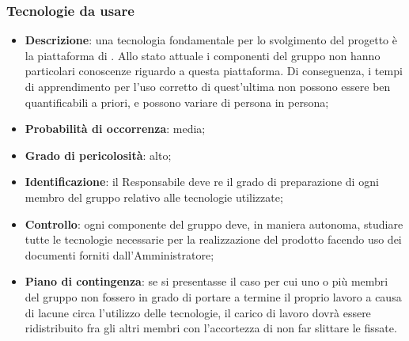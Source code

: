 \subsubsection{Tecnologie da usare}
\begin{itemize}
			\item \textbf{Descrizione}: una tecnologia fondamentale per lo svolgimento del progetto è la piattaforma  di . Allo stato attuale i componenti del gruppo non hanno particolari conoscenze riguardo a questa piattaforma. Di conseguenza, i tempi di apprendimento per l'uso corretto di quest'ultima non possono essere ben quantificabili a priori, e possono variare di persona in persona;
			\item \textbf{Probabilità di occorrenza}: media;
			\item \textbf{Grado di pericolosità}: alto;
			\item \textbf{Identificazione}: il Responsabile deve re il grado di preparazione di ogni membro del gruppo relativo alle tecnologie utilizzate;
			\item \textbf{Controllo}: ogni componente del gruppo deve, in maniera autonoma, studiare tutte le tecnologie necessarie per la realizzazione del prodotto facendo uso dei documenti forniti dall'Amministratore;
			\item \textbf{Piano di contingenza}: se si presentasse il caso per cui uno o più membri del gruppo non fossero in grado di portare a termine il proprio lavoro a causa di lacune circa l'utilizzo delle tecnologie, il carico di lavoro dovrà essere ridistribuito fra gli altri membri con l'accortezza di non far slittare le  fissate.
\end{itemize}
		
